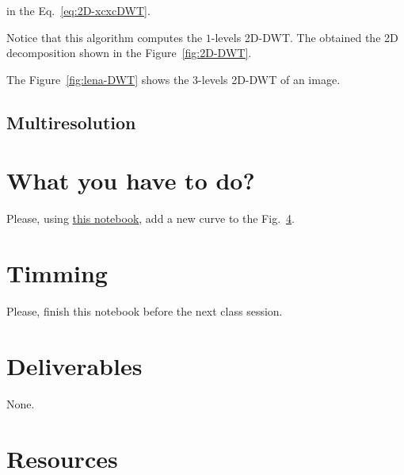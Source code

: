 in the Eq.~\ref{eq:2D-xcxcDWT}.

Notice that this algorithm computes the $1$-levels
2D-DWT. The obtained the 2D decomposition shown in the
Figure~\ref{fig:2D-DWT}.



The Figure~\ref{fig:lena-DWT} shows the $3$-levels 2D-DWT of an image.

\subsection{Multiresolution}

\section{What you have to do?}
  
Please, using \href{}{this notebook}, add a new curve to the Fig.~\ref{}.

\section{Timming}

Please, finish this notebook before the next class session.

\section{Deliverables}

None.

\section{Resources}


